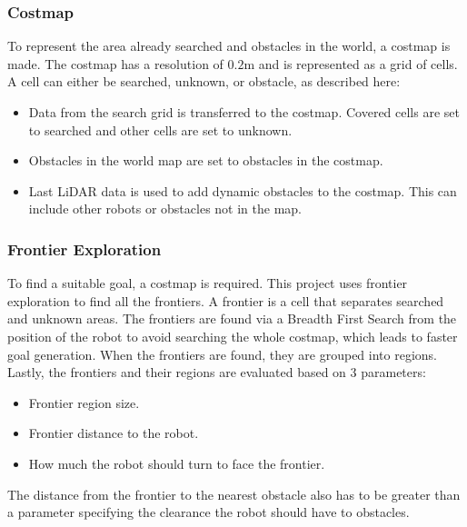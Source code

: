 \subsubsection{Costmap}\label{sec:costmap}
To represent the area already searched and obstacles in the world, a costmap is made. 
The costmap has a resolution of $0.2$m and is represented as a grid of cells. A cell can either be searched, unknown, or obstacle, as described here:
\begin{itemize}
  \item Data from the search grid is transferred to the costmap. Covered cells are set to searched and other cells are set to unknown.
  \item Obstacles in the world map are set to obstacles in the costmap.
  \item Last LiDAR data is used to add dynamic obstacles to the costmap. This can include other robots or obstacles not in the map.
\end{itemize}

\subsubsection{Frontier Exploration}\label{sec:frontier_exploration}
To find a suitable goal, a costmap is required.
This project uses frontier exploration to find all the frontiers. 
A frontier is a cell that separates searched and unknown areas. 
The frontiers are found via a Breadth First Search from the position of the robot to avoid searching the whole costmap, which leads to faster goal generation. When the frontiers are found, they are grouped into regions. 
Lastly, the frontiers and their regions are evaluated based on 3 parameters:
\begin{itemize}
  \item Frontier region size.
  \item Frontier distance to the robot.
  \item How much the robot should turn to face the frontier.
\end{itemize}
The distance from the frontier to the nearest obstacle also has to be greater than a parameter specifying the clearance the robot should have to obstacles.

